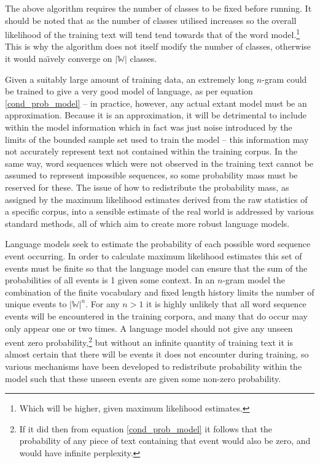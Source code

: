 The above algorithm requires the number of classes to be fixed before
running. It should be noted that as the number of classes utilised
increases so the overall likelihood of the training text will tend
tend towards that of the word model.\footnote{Which will be higher,
given maximum likelihood estimates.}  This is why the algorithm does
not itself modify the number of classes, otherwise it would
na\"{\i}vely converge on $|\mathbb{W}|$ classes.



\label{robust_estimation}
Given a suitably large amount of training data, an extremely long $n$-gram
could be trained to give a very good model of language, as per equation
\ref{cond_prob_model} -- in practice, however,
any actual extant model must be an approximation. Because it is an
approximation, it will be detrimental to include within the model
information which in fact was just noise introduced by the limits of
the bounded sample set used to train the model -- this information may
not accurately represent text not contained within the training
corpus. In the same way, word sequences which were not observed in the
training text cannot be assumed to represent impossible sequences, so
some probability mass must be reserved for these. The issue of how to
redistribute the probability mass, as assigned by the maximum likelihood
estimates derived from the raw statistics of a specific corpus, into a
sensible estimate of the real world is addressed by various standard
methods, all of which aim to create more robust language models.

\label{discounting_and_other_fun_things}
Language models seek to estimate the probability of each possible word
sequence event occurring. In order to calculate maximum likelihood
estimates this set of events must be finite so that the language model
can ensure that the sum of the probabilities of all events is 1 given
some context. In an $n$-gram model the combination of the finite vocabulary
and fixed length history limits the number of unique events to
$|\mathbb{W}|^n$.  For any $n>1$ it is highly unlikely that all word
sequence events will be encountered in the training corpora, and many
that do occur may only appear one or two times. A language model
should not give any unseen event zero probability,\footnote{If it did
then from equation \ref{cond_prob_model} it follows that the
probability of any piece of text containing that event would also be
zero, and would have infinite perplexity.} but without an infinite
quantity of training text it is almost certain that there will be
events it does not encounter during training, so various mechanisms
have been developed to redistribute probability within the model such that these
unseen events are given some non-zero probability. %

